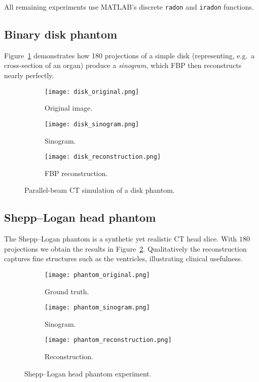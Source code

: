 \documentclass[11pt]{article}
\begin{document}
All remaining experiments use MATLAB’s discrete \texttt{radon} and
\texttt{iradon} functions.

\subsection{Binary disk phantom}

Figure~\ref{fig:disk} demonstrates how 180 projections of a simple disk
(representing, e.g.\ a cross-section of an organ) produce a
\emph{sinogram}, which FBP then reconstructs nearly perfectly.

\begin{figure}[h]
\centering
\begin{subfigure}[b]{0.30\textwidth}
  \texttt{[image: disk\_original.png]}
  \caption{Original image.}
\end{subfigure}
\hfill
\begin{subfigure}[b]{0.34\textwidth}
  \texttt{[image: disk\_sinogram.png]}
  \caption{Sinogram.}
\end{subfigure}
\hfill
\begin{subfigure}[b]{0.30\textwidth}
  \texttt{[image: disk\_reconstruction.png]}
  \caption{FBP reconstruction.}
\end{subfigure}
\caption{Parallel-beam CT simulation of a disk phantom.}
\label{fig:disk}
\end{figure}

\subsection{Shepp–Logan head phantom}

The Shepp–Logan phantom is a synthetic yet realistic CT head slice.
With $180$ projections we obtain the results in
Figure~\ref{fig:phantom}.  
Qualitatively the reconstruction captures fine structures such as the
ventricles, illustrating clinical usefulness.

\begin{figure}[h]
\centering
\begin{subfigure}[b]{0.30\textwidth}
  \texttt{[image: phantom\_original.png]}
  \caption{Ground truth.}
\end{subfigure}
\hfill
\begin{subfigure}[b]{0.34\textwidth}
  \texttt{[image: phantom\_sinogram.png]}
  \caption{Sinogram.}
\end{subfigure}
\hfill
\begin{subfigure}[b]{0.30\textwidth}
  \texttt{[image: phantom\_reconstruction.png]}
  \caption{Reconstruction.}
\end{subfigure}
\caption{Shepp–Logan head phantom experiment.}
\label{fig:phantom}
\end{figure}
\end{document}
